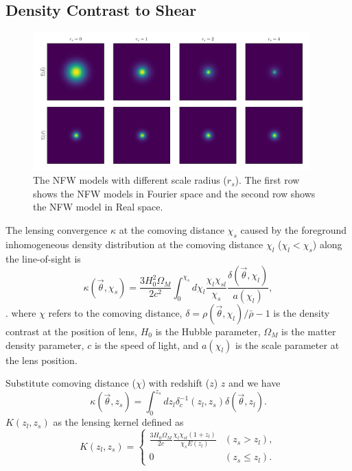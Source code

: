 \documentclass[twocolumn]{aastex62}
\begin{document}
\subsection{Density Contrast to Shear}
\label{subsec:method-delta2shear}

\begin{figure}
    \includegraphics[width=0.95\textwidth]{nfwlet-atom-2D.pdf}
    \caption{The NFW models with different scale radius ($r_s$). The first row shows the NFW models in Fourier
            space and the second row shows the NFW model in Real space.}
\end{figure}

The lensing convergence $\kappa$ at the comoving distance $\chi_s$ caused by the foreground inhomogeneous
density distribution at the comoving distance $\chi_l$ ($\chi_l< \chi_s$) along the line-of-sight is
\begin{equation}
\kappa(\vec{\theta},\chi_s)=\frac{3H_0^2\Omega_M}{2 c^2} \int_0^{\chi_s} d\chi_l \frac{\chi_l \chi_{sl}}{\chi_s}
\frac{\delta(\vec{\theta},\chi_l)}{a(\chi_l)},
\end{equation}
\citep{LSS-massMap-Glimpse3D-Leonard2014}.
where $\chi$ refers to the comoving distance, $\delta=\rho(\vec{\theta},\chi_l)/\bar{\rho}-1$ is the density contrast
at the position of lens, $H_0$ is the Hubble parameter, $\Omega_M$ is the matter density parameter, $c$ is the speed
of light, and $a(\chi_l)$ is the scale parameter at the lens position.

Substitute comoving distance ($\chi$) with redshift ($z$)
$z$ and we have
\begin{equation}\label{eq-delta2kappa}
\kappa(\vec{\theta},z_s)=\int_0^{z_s} dz_l \delta_{c}^{-1}(z_l,z_s)\delta(\vec{\theta},z_l).
\end{equation}
$K(z_l,z_s)$ as the lensing kernel defined as
\begin{equation}
K(z_l,z_s) =
\begin{cases}
\frac{3H_0\Omega_M}{2 c} \frac{\chi_l \chi_{sl} (1+z_l)}{\chi_{s} E\left(z_l\right)} & (z_s>z_l),\\
0&(z_s \leq z_l).
\end{cases}
\end{equation}
\end{document}
